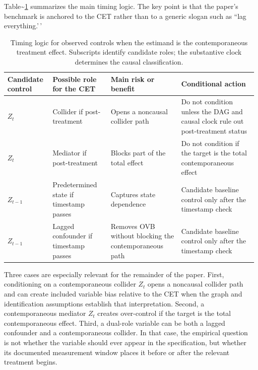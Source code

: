 \documentclass[
]{article}
\begin{document}
Table\textasciitilde{}\ref{tab:timing_logic} summarizes the main timing
logic. The key point is that the paper's benchmark is anchored to the
CET rather than to a generic slogan such as ``lag everything.'\,'

\begin{table}[!h]
\centering
\caption{\label{tab:timing-logic-table}Timing logic for observed controls when the estimand is the contemporaneous treatment effect. Subscripts identify candidate roles; the substantive clock determines the causal classification. \label{tab:timing_logic}}
\centering
\fontsize{9}{11}\selectfont
\begin{tabular}[t]{>{\raggedright\arraybackslash}p{0.70in}>{\raggedright\arraybackslash}p{1.35in}>{\raggedright\arraybackslash}p{1.45in}>{\raggedright\arraybackslash}p{2.20in}}
\toprule
Candidate control & Possible role for the CET & Main risk or benefit & Conditional action\\
\midrule
$Z_t$ & Collider if post-treatment & Opens a noncausal collider path & Do not condition unless the DAG and causal clock rule out post-treatment status\\
$Z_t$ & Mediator if post-treatment & Blocks part of the total effect & Do not condition if the target is the total contemporaneous effect\\
$Z_{t-1}$ & Predetermined state if timestamp passes & Captures state dependence & Candidate baseline control only after the timestamp check\\
$Z_{t-1}$ & Lagged confounder if timestamp passes & Removes OVB without blocking the contemporaneous path & Candidate baseline control only after the timestamp check\\
\bottomrule
\end{tabular}
\end{table}

Three cases are especially relevant for the remainder of the paper.
First, conditioning on a contemporaneous collider \(Z_t\) opens a
noncausal collider path and can create included variable bias relative
to the CET when the graph and identification assumptions establish that
interpretation. Second, a contemporaneous mediator \(Z_t\) creates
over-control if the target is the total contemporaneous effect. Third, a
dual-role variable can be both a lagged confounder and a contemporaneous
collider. In that case, the empirical question is not whether the
variable should ever appear in the specification, but whether its
documented measurement window places it before or after the relevant
treatment begins.
\end{document}
